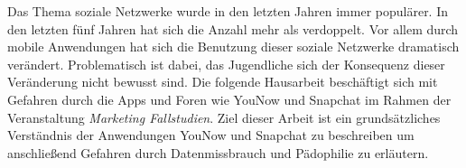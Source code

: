 Das Thema soziale Netzwerke wurde in den letzten Jahren immer populärer. In den
letzten f\"unf Jahren hat sich die Anzahl mehr als verdoppelt. Vor allem durch
mobile Anwendungen hat sich die Benutzung dieser soziale Netzwerke dramatisch
verändert. Problematisch ist dabei, das Jugendliche sich der Konsequenz dieser
Veränderung nicht bewusst sind.  Die folgende Hausarbeit beschäftigt sich mit
Gefahren durch die Apps und Foren wie YouNow und Snapchat im Rahmen der
Veranstaltung \emph{Marketing Fallstudien}. Ziel dieser Arbeit ist ein
grundsätzliches Verständnis der Anwendungen YouNow und Snapchat zu beschreiben
um anschlie{\ss}end Gefahren durch Datenmissbrauch und Pädophilie zu erläutern.
